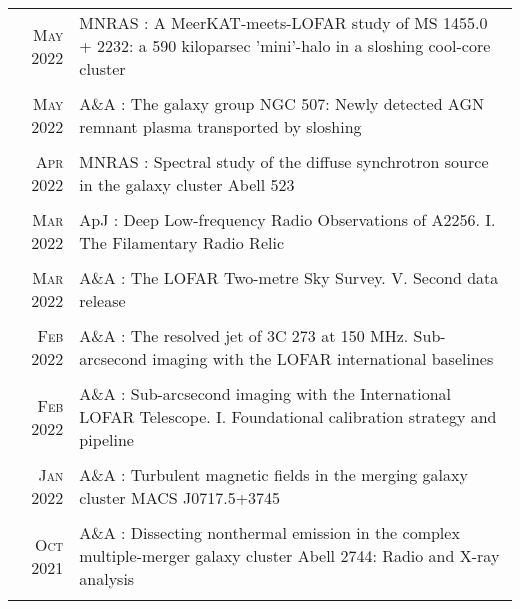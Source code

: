 \documentclass[11pt,a4paper,notitlepage]{article}
\begin{document}
\begin{tabular}{r|p{12.5cm}}

\textsc{May 2022} & MNRAS : A MeerKAT-meets-LOFAR study of MS 1455.0 + 2232: a 590 kiloparsec 'mini'-halo in a sloshing cool-core cluster \citep{2022MNRAS.512.4210R} \\
\multicolumn{2}{c}{} \\


	\textsc{May 2022} & A\&A : The galaxy group NGC 507: Newly detected AGN remnant plasma transported by sloshing \citep{2022AA...661A..92B} \\
\multicolumn{2}{c}{} \\

\textsc{Apr 2022} & MNRAS : Spectral study of the diffuse synchrotron source in the galaxy cluster Abell 523 \citep{2022MNRAS.511.3389V} \\
\multicolumn{2}{c}{} \\

\textsc{Mar 2022} & ApJ : Deep Low-frequency Radio Observations of A2256. I. The Filamentary Radio Relic \citep{2022ApJ...927...80R} \\
\multicolumn{2}{c}{} \\


	\textsc{Mar 2022} & A\&A : The LOFAR Two-metre Sky Survey. V. Second data release \citep{2022AA...659A...1S} \\
	\multicolumn{2}{c}{} \\

	\textsc{Feb 2022} & A\&A : The resolved jet of 3C 273 at 150 MHz. Sub-arcsecond imaging with the LOFAR international baselines \citep{2022AA...658A...8H} \\
	\multicolumn{2}{c}{} \\

	\textsc{Feb 2022} & A\&A : Sub-arcsecond imaging with the International LOFAR Telescope. I. Foundational calibration strategy and pipeline \citep{2022AA...658A...1M} \\
	\multicolumn{2}{c}{} \\
	
	\textsc{Jan 2022} & A\&A : Turbulent magnetic fields in the merging galaxy cluster MACS J0717.5+3745 \citep{2022AA...657A...2R} \\
	\multicolumn{2}{c}{} \\

	\textsc{Oct 2021} & A\&A : Dissecting nonthermal emission in the complex multiple-merger galaxy cluster Abell 2744: Radio and X-ray analysis \citep{2021AA...654A..41R} \\
	\multicolumn{2}{c}{} \\
	

\end{tabular}
\end{document}
